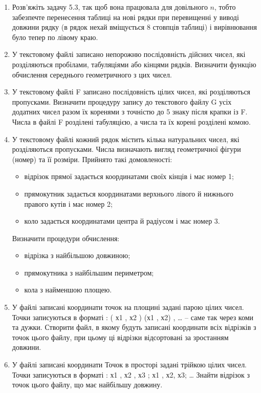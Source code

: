 \documentclass[a5paper,titlepage,openany,twoside,
]
{book_unv}%
\begin{document}
\begin{enumerate}
\item 
Розв'яжіть задачу 5.3, так щоб вона працювала для довільного $n$, тобто
забезпечте перенесення таблиці на нові рядки при перевищенні у виводі довжини рядку
(в рядок нехай вміщується 8 стовпців таблиці) і вирівнювання було тепер по лівому краю.

\item
У текстовому файлі записано непорожню послідовність дійсних чисел,
які розділяються пробілами, табуляціями або кінцями рядків.
 Визначити функцію обчислення середнього геометричного з цих чисел.

\item
У текстовому файлі F записано послідовність цілих чисел, які розділяються пропусками. 
Визначити процедуру запису до текстового файлу G усіх додатних чисел разом їх коренями з 
точністю до 5 знаку після крапки із F. Числа в файлі F розділені табуляцією, 
а числа та їх корені розділені комою.

\item
У текстовому файлі кожний рядок містить кілька натуральних чисел, які розділяються пропусками.
Числа визначають вигляд геометричної фігури (номер) та її розміри. Прийнято такі домовленості:
\begin{itemize}
\item
відрізок прямої задається координатами своїх кінців і має номер 1;
\item
прямокутник задається координатами верхнього лівого й нижнього правого кутів і має номер 2;
\item
коло задається координатами центра й радіусом і має номер 3.
\end{itemize}

Визначити процедури обчислення:
\begin{itemize}
\item відрізка з найбільшою довжиною;
\item прямокутника з найбільшим периметром;
\item кола з найменшою площею.
\end{itemize}


\item 
У файлі записані координати точок на площині задані парою цілих
чисел. Точки записуються в форматі : ( х1 , х2 ) (х1 , х2) , \ldots{} --
саме так через коми та дужки. Створити файл, в якому будуть записані
координати всіх відрізків з точок цього файлу, при цьому ці відрізки
відсортовані за зростанням довжини.

\item 
У файлі записані координати Точок в просторі задані трійкою цілих
чисел. Точки записуються в форматі : х1 , х2 , х3 ; х1 , х2, х3;
\ldots{} Знайти відрізок з точок цього файлу, що має найбільшу довжину.


\end{enumerate}
\end{document}
